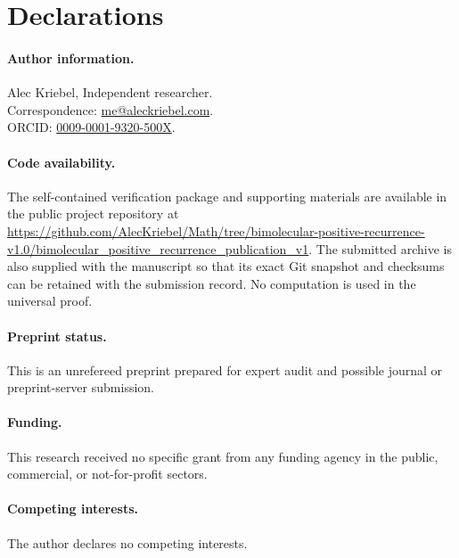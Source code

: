 \section*{Declarations}

\paragraph{Author information.}
Alec Kriebel, Independent researcher.\\
Correspondence: \mbox{\href{mailto:me@aleckriebel.com}{me@aleckriebel.com}}.\\
ORCID: \href{https://orcid.org/0009-0001-9320-500X}{0009-0001-9320-500X}.

\paragraph{Code availability.}
The self-contained verification package and supporting materials are
available in the public project repository at
\url{https://github.com/AlecKriebel/Math/tree/bimolecular-positive-recurrence-v1.0/bimolecular_positive_recurrence_publication_v1}.
The submitted archive is also supplied with the manuscript so that its exact
Git snapshot and checksums can be retained with the submission record.  No
computation is used in the universal proof.

\paragraph{Preprint status.}
This is an unrefereed preprint prepared for expert audit and possible journal
or preprint-server submission.

\paragraph{Funding.}
This research received no specific grant from any funding agency in the public,
commercial, or not-for-profit sectors.

\paragraph{Competing interests.}
The author declares no competing interests.

